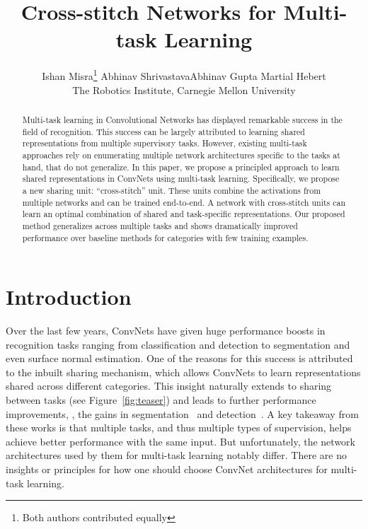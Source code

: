 \documentclass[10pt,twocolumn,letterpaper]{article}
\begin{document}
\title{Cross-stitch Networks for Multi-task Learning}

\author{
    Ishan Misra\thanks{Both authors contributed equally} \quad \quad Abhinav Shrivastava\footnotemark[1] \quad \quad Abhinav Gupta \quad \quad Martial Hebert \\
    The Robotics Institute, Carnegie Mellon University
}

\maketitle


\begin{abstract}
Multi-task learning in Convolutional Networks has displayed remarkable success in the field of recognition. This success can be largely attributed to learning shared representations from multiple supervisory tasks. However, existing multi-task approaches rely on enumerating multiple network architectures specific to the tasks at hand, that do not generalize. In this paper, we propose a principled approach to learn shared representations in ConvNets using multi-task learning. Specifically, we propose a new sharing unit: ``cross-stitch'' unit. These units combine the activations from multiple networks and can be trained end-to-end. A network with cross-stitch units can learn an optimal combination of shared and task-specific representations. Our proposed method generalizes across multiple tasks and shows dramatically improved performance over baseline methods for categories with few training examples.
\end{abstract}


\section{Introduction}
Over the last few years, ConvNets have given huge performance boosts in recognition tasks ranging from classification and detection to segmentation and even surface normal estimation.
One of the reasons for this success is attributed to the inbuilt sharing mechanism, which allows ConvNets to learn representations shared across different categories. 
This insight naturally extends to sharing between tasks (see Figure~\ref{fig:teaser}) and leads to further performance improvements, \eg, the gains in segmentation~\cite{SDS} and detection~\cite{fast-rcnn,nikos}.
A key takeaway from these works is that multiple tasks, and thus multiple types of supervision, helps achieve better performance with the same input. 
But unfortunately, the network architectures used by them for multi-task learning notably differ. There are no insights or principles for how one should choose ConvNet architectures for multi-task learning.
\end{document}
